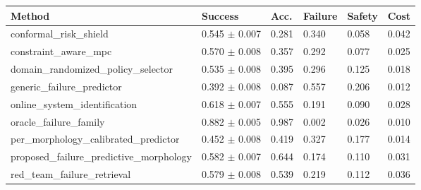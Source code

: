 \begin{tabular}{llllll}
\toprule
Method & Success & Acc. & Failure & Safety & Cost \\
\midrule
conformal\_risk\_shield & 0.545 $\pm$ 0.007 & 0.281 & 0.340 & 0.058 & 0.042 \\
constraint\_aware\_mpc & 0.570 $\pm$ 0.008 & 0.357 & 0.292 & 0.077 & 0.025 \\
domain\_randomized\_policy\_selector & 0.535 $\pm$ 0.008 & 0.395 & 0.296 & 0.125 & 0.018 \\
generic\_failure\_predictor & 0.392 $\pm$ 0.008 & 0.087 & 0.557 & 0.206 & 0.012 \\
online\_system\_identification & 0.618 $\pm$ 0.007 & 0.555 & 0.191 & 0.090 & 0.028 \\
oracle\_failure\_family & 0.882 $\pm$ 0.005 & 0.987 & 0.002 & 0.026 & 0.010 \\
per\_morphology\_calibrated\_predictor & 0.452 $\pm$ 0.008 & 0.419 & 0.327 & 0.177 & 0.014 \\
proposed\_failure\_predictive\_morphology & 0.582 $\pm$ 0.007 & 0.644 & 0.174 & 0.110 & 0.031 \\
red\_team\_failure\_retrieval & 0.579 $\pm$ 0.008 & 0.539 & 0.219 & 0.112 & 0.036 \\
\bottomrule
\end{tabular}
